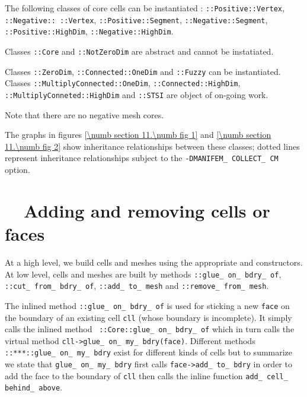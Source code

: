 The following classes of core cells can be instantiated :
{\small\tt{}::Positive::Vertex}, {\small\tt{}::Negative:: ::Vertex},
{\small\tt{}::Positive::Segment}, {\small\tt{}::Negative::Segment},
{\small\tt{}::Positive::HighDim},\break
{\small\tt{}::Negative::HighDim}.

Classes {\small\tt{}::Core} and {\small\tt{}::NotZeroDim} are abstract
and cannot be instatiated.

Classes {\small\tt{}::ZeroDim}, {\small\tt{}::Connected::OneDim} and
{\small\tt{}::Fuzzy} can be instantiated.
Classes {\small\tt{}::MultiplyConnected::OneDim},
{\small\tt{}::Connected::HighDim}, {\small\tt{}::MultiplyConneted::HighDim}
and {\small\tt{}::STSI} are object of on-going work.

Note that there are no negative mesh cores.

The graphs in figures \ref{\numb section 11.\numb fig 1} and \ref{\numb section 11.\numb fig 2}
show inheritance relationships between these classes; dotted lines represent
inheritance relationships  subject to the {\small\tt -DMANIFEM\_\,COLLECT\_\,CM} option.


\section{~~Adding and removing cells or faces}\label{\numb section 11.\numb parag 9}

At a high level, we build cells and meshes using the appropriate {\small\tt{}} and
{\small\tt{}} constructors.
At low level, cells and meshes are built by methods {\small\tt{}::glue\_\,on\_\,bdry\_\,of},
{\small\tt{}::cut\_\,from\_\,bdry\_\,of}, {\small\tt{}::add\_\,to\_\,mesh} and
{\small\tt{}::remove\_\,from\_\,mesh}.

The inlined method {\small\tt{}::glue\_\,on\_\,bdry\_\,of} is used for sticking a new
{\small\tt face} on the
boundary of an existing cell {\small\tt cll} (whose boundary is incomplete).
It simply calls the inlined method \ {\small\tt{}::Core::glue\_\,on\_\,bdry\_\,of}
which in turn calls the virtual method {\small\tt cll->glue\_\,on\_\,my\_\,bdry(face)}.
Different methods {\small\tt{}::***::glue\_\,on\_\,my\_\,bdry} exist for different kinds of
cells but to summarize we state that {\small\tt glue\_\,on\_\,my\_\,bdry} first calls
{\small\tt face->add\_\,to\_\,bdry} in order to add the face to the boundary of {\small\tt cll}
then calls the inline function {\small\tt add\_\,cell\_\,behind\_\,above}.

